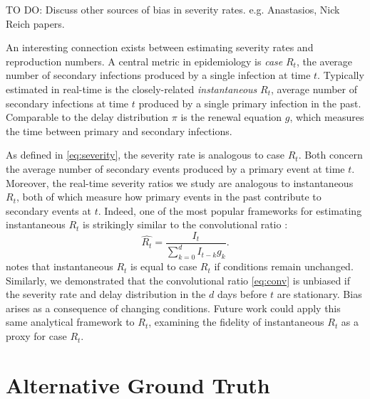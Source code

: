 \documentclass{article}
\begin{document}
TO DO: Discuss other sources of bias in severity rates. e.g. Anastasios, Nick Reich papers.

An interesting connection exists between estimating severity rates and reproduction numbers. A central metric in epidemiology is \textit{case} $R_t$, the average number of secondary infections produced by a single infection at time $t$. Typically estimated in real-time is the closely-related \textit{instantaneous} $R_t$, average number of secondary infections at time $t$ produced by a single primary infection in the past. Comparable to the delay distribution $\pi$ is the renewal equation $g$, which measures the time between primary and secondary infections.

As defined in \ref{eq:severity}, the severity rate is analogous to case $R_t$. Both concern the average number of secondary events produced by a primary event at time $t$. Moreover, the real-time severity ratios we study are analogous to instantaneous $R_t$, both of which measure how primary events in the past contribute to secondary events at $t$. Indeed, one of the most popular frameworks for estimating instantaneous $R_t$ is strikingly similar to the convolutional ratio \cite{fraser2007,wallinga2007how,cori2013new}:
\begin{equation}\label{eq:instRt}
    \hat{R_t} = \frac{I_t}{\sum_{k=0}^d I_{t-k}g_k}.
\end{equation}
\citeauthor{fraser2007} notes that instantaneous $R_t$ is equal to case $R_t$ if conditions remain unchanged. Similarly, we demonstrated that the convolutional ratio \ref{eq:conv} is unbiased if the severity rate and delay distribution in the $d$ days before $t$ are stationary. Bias arises as a consequence of changing conditions. Future work could apply this same analytical framework to $R_t$, examining the fidelity of instantaneous $R_t$ as a proxy for case $R_t$. 





\pagebreak
\appendix
\section{Alternative Ground Truth}\label{apx:alt_gt}
\end{document}
